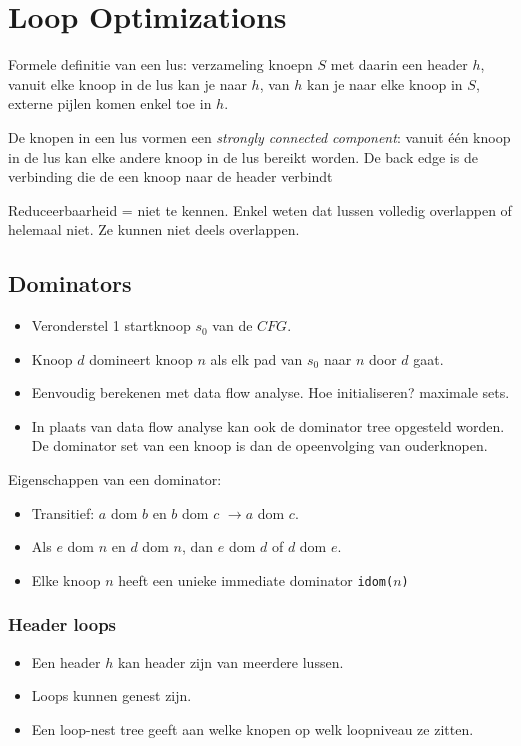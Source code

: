\chapter{Loop Optimizations}

Formele definitie van een lus: verzameling knoepn $S$ met daarin een header $h$, vanuit elke knoop in de lus kan je naar $h$, van $h$ kan je naar elke knoop in $S$, externe pijlen komen enkel toe in $h$.

De knopen in een lus vormen een \textit{strongly connected component}: vanuit één knoop in de lus kan elke andere knoop in de lus bereikt worden. De back edge is de verbinding die de een knoop naar de header verbindt

Reduceerbaarheid = niet te kennen. Enkel weten dat lussen volledig overlappen of helemaal niet. Ze kunnen niet deels overlappen.

\section{Dominators}
\begin{itemize}
	\item Veronderstel 1 startknoop $s_0$ van de $CFG$.
	\item Knoop $d$ domineert knoop $n$ als elk pad van $s_0$ naar $n$ door $d$ gaat.
	\item Eenvoudig berekenen met data flow analyse. Hoe initialiseren? maximale sets. 
	\item In plaats van data  flow analyse kan ook de dominator tree opgesteld worden. De dominator set van een knoop is dan de opeenvolging van ouderknopen.
\end{itemize}

Eigenschappen van een dominator:
\begin{itemize}
	\item Transitief: $a$ dom $b$ en $b$ dom $c$ $\rightarrow a$ dom $c$.
	\item Als $e$ dom $n$ en $d$ dom $n$, dan $e$ dom $d$ of $d$ dom $e$.
	\item Elke knoop $n$ heeft een unieke immediate dominator \texttt{idom($n$)}
\end{itemize}

\subsection{Header loops}
\begin{itemize}
	\item Een header $h$ kan header zijn van meerdere lussen.
	\item Loops kunnen genest zijn.
	\item Een loop-nest tree geeft aan welke knopen op welk loopniveau ze zitten.

\end{itemize}

